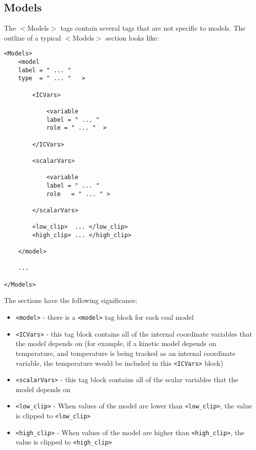 \subsection{Models}\label{subsec:models}
The $<$Models$>$ tags contain several tags that are not specific to models.  The outline of a typical $<$Models$>$ section looks like:

\begin{Verbatim}[fontsize=\footnotesize]
<Models>
	<model
	label = " ... "
	type  = " ... "   >

		<ICVars>

			<variable	
			label = " ... "
			role = " ... "  >

		</ICVars>

		<scalarVars>
		
			<variable	
			label = " ... "
			role   = " ... " >

		</scalarVars>

		<low_clip>  ... </low_clip>
		<high_clip> ... </high_clip>

	</model>
	
	...
	
</Models>
\end{Verbatim}

The sections have the following significance:

\begin{itemize}
\item \verb=<model>= - there is a \verb=<model>= tag block for each coal model
\item \verb=<ICVars>= - this tag block contains all of the internal coordinate variables that the model depends on (for example, if a kinetic model depends on temperature, and temperature is being tracked as an internal coordinate variable, the temperature would be included in this \verb=<ICVars>= block)
\item \verb=<scalarVars>= - this tag block contains all of the scalar variables that the model depends on
\item \verb=<low_clip>= - When values of the model are lower than \verb=<low_clip>=, the value is clipped to \verb=<low_clip>=
\item \verb=<high_clip>= - When values of the model are higher than \verb=<high_clip>=, the value is clipped to \verb=<high_clip>=
\end{itemize}

